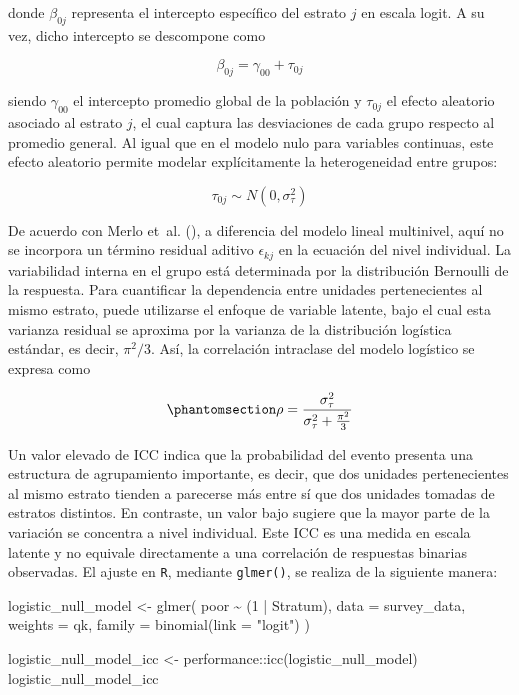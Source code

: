 \documentclass[
  spanish,
  11pt,
  letterpaper,
  oneside,
  open=any]{scrbook}
\newenvironment{Shaded}{\begin{snugshade}}{\end{snugshade}}
\newcommand{\AttributeTok}[1]{\textcolor[rgb]{0.40,0.45,0.13}{#1}}
\newcommand{\DecValTok}[1]{\textcolor[rgb]{0.68,0.00,0.00}{#1}}
\newcommand{\FunctionTok}[1]{\textcolor[rgb]{0.28,0.35,0.67}{#1}}
\newcommand{\NormalTok}[1]{\textcolor[rgb]{0.00,0.23,0.31}{#1}}
\newcommand{\OtherTok}[1]{\textcolor[rgb]{0.00,0.23,0.31}{#1}}
\newcommand{\SpecialCharTok}[1]{\textcolor[rgb]{0.37,0.37,0.37}{#1}}
\newcommand{\StringTok}[1]{\textcolor[rgb]{0.13,0.47,0.30}{#1}}
\begin{document}
donde \(\beta_{0j}\) representa el intercepto específico del estrato
\(j\) en escala logit. A su vez, dicho intercepto se descompone como

\[
\beta_{0j} = \gamma_{00} + \tau_{0j}
\]

siendo \(\gamma_{00}\) el intercepto promedio global de la población y
\(\tau_{0j}\) el efecto aleatorio asociado al estrato \(j\), el cual
captura las desviaciones de cada grupo respecto al promedio general. Al
igual que en el modelo nulo para variables continuas, este efecto
aleatorio permite modelar explícitamente la heterogeneidad entre grupos:

\[
\tau_{0j} \sim N(0,\sigma_{\tau}^{2})
\]

De acuerdo con Merlo et~al. (), a
diferencia del modelo lineal multinivel, aquí no se incorpora un término
residual aditivo \(\epsilon_{kj}\) en la ecuación del nivel individual.
La variabilidad interna en el grupo está determinada por la distribución
Bernoulli de la respuesta. Para cuantificar la dependencia entre
unidades pertenecientes al mismo estrato, puede utilizarse el enfoque de
variable latente, bajo el cual esta varianza residual se aproxima por la
varianza de la distribución logística estándar, es decir, \(\pi^2/3\).
Así, la correlación intraclase del modelo logístico se expresa como

\begin{equation}\protect\phantomsection\label{eq-cci-logistico}{
\rho =
\frac{\sigma_\tau^2}
{\sigma_\tau^2 + \frac{\pi^2}{3}}
}\end{equation}

Un valor elevado de ICC indica que la probabilidad del evento presenta
una estructura de agrupamiento importante, es decir, que dos unidades
pertenecientes al mismo estrato tienden a parecerse más entre sí que dos
unidades tomadas de estratos distintos. En contraste, un valor bajo
sugiere que la mayor parte de la variación se concentra a nivel
individual. Este ICC es una medida en escala latente y no equivale
directamente a una correlación de respuestas binarias observadas. El
ajuste en \texttt{R}, mediante \texttt{glmer()}, se realiza de la
siguiente manera:

\begin{Shaded}
\begin{Highlighting}[]
\NormalTok{logistic\_null\_model }\OtherTok{\textless{}{-}} \FunctionTok{glmer}\NormalTok{(}
\NormalTok{  poor }\SpecialCharTok{\textasciitilde{}}\NormalTok{ (}\DecValTok{1} \SpecialCharTok{|}\NormalTok{ Stratum),}
  \AttributeTok{data =}\NormalTok{ survey\_data,}
  \AttributeTok{weights =}\NormalTok{ qk,}
  \AttributeTok{family =} \FunctionTok{binomial}\NormalTok{(}\AttributeTok{link =} \StringTok{"logit"}\NormalTok{)}
\NormalTok{)}

\NormalTok{logistic\_null\_model\_icc }\OtherTok{\textless{}{-}}\NormalTok{ performance}\SpecialCharTok{::}\FunctionTok{icc}\NormalTok{(logistic\_null\_model)}
\NormalTok{logistic\_null\_model\_icc}
\end{Highlighting}
\end{Shaded}
\end{document}
